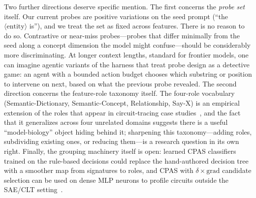 Two further directions deserve specific mention. The first concerns the \emph{probe set} itself. Our current probes are positive variations on the seed prompt (``the $\langle\mathrm{entity}\rangle$ is''), and we treat the set as fixed across features. There is no reason to do so. Contrastive or near-miss probes---probes that differ minimally from the seed along a concept dimension the model might confuse---should be considerably more discriminating. At longer context lengths, standard for frontier models, one can imagine agentic variants of the harness that treat probe design as a detective game: an agent with a bounded action budget chooses which substring or position to intervene on next, based on what the previous probe revealed. The second direction concerns the feature-role taxonomy itself. The four-role vocabulary (Semantic-Dictionary, Semantic-Concept, Relationship, Say-X) is an empirical extension of the roles that appear in circuit-tracing case studies~\cite{lindsey2025biology}, and the fact that it generalizes across four unrelated domains suggests there is a useful ``model-biology'' object hiding behind it; sharpening this taxonomy---adding roles, subdividing existing ones, or reducing them---is a research question in its own right. Finally, the grouping machinery itself is open: learned CPAS classifiers trained on the rule-based decisions could replace the hand-authored decision tree with a smoother map from signatures to roles, and CPAS with $\delta \times \mathrm{grad}$ candidate selection can be used on dense MLP neurons to profile circuits outside the SAE/CLT setting~\cite{anon2026sparsity}.





